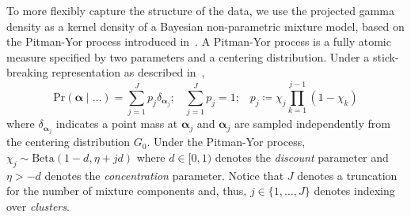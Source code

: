 To more flexibly capture the structure of the data, we use the projected gamma density 
    as a kernel density of a Bayesian non-parametric mixture model, based on 
    the Pitman-Yor process introduced in~\cite{perman1992}.  A Pitman-Yor process
    is a fully atomic measure specified by two parameters and a centering
    distribution.  Under a stick-breaking representation as described 
    in~\cite{ishwaran2001}, 
    \begin{equation}
        \label{eqn:stickbreak}
        \text{Pr}(\bm{\alpha}\mid\ldots) 
            = \sum_{j = 1}^Jp_j\delta_{\bm{\alpha}_j};\;\;\;
            \sum_{j=1}^Jp_j = 1;\;\;\;
            p_j \coloneqq\chi_j\prod_{k = 1}^{j-1}(1 - \chi_k)
    \end{equation}
    where $\delta_{\bm{\alpha}_j}$ indicates a point mass at $\bm{\alpha}_j$ and
    $\bm{\alpha}_j$ are sampled independently from the centering distribution $G_0$.
    Under the Pitman-Yor process, $\chi_j \sim \text{Beta}(1 - d, \eta + jd)$
    where $d \in [0, 1)$ denotes the \emph{discount} parameter and $\eta > -d$
    denotes the \emph{concentration} parameter. Notice that $J$ denotes a
    truncation for the number of mixture components and, thus, $j\in \lbrace 1,\ldots,J\rbrace$ 
    denotes indexing over \emph{clusters}.

